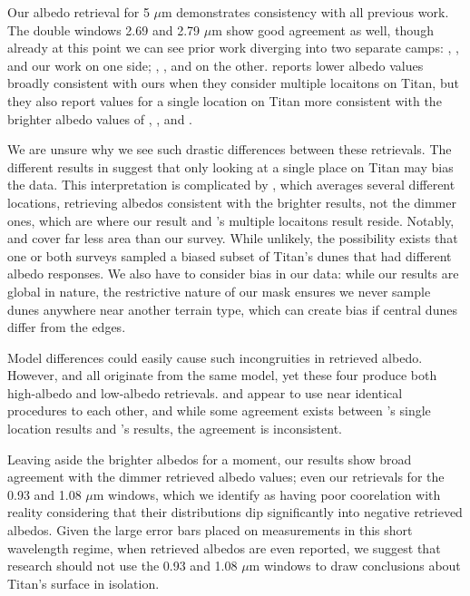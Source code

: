 \documentclass[twocolumn,linenumbers]{aastex631}
\begin{document}
\begin{table}[htbp]
\label{table:theTable}

\end{table}

Our albedo retrieval for 5 $\mu$m demonstrates consistency with all previous work. The double windows 2.69 and 2.79 $\mu$m show good agreement as well, though already at this point we can see prior work diverging into two separate camps: \cite{McCord2006}, \cite{EsSayeh2023}, and our work on one side; \cite{Bonnefoy2016}, \cite{Lopes2016}, and \cite{Brossier2018} on the other. \cite{Solomonidou2018} reports lower albedo values broadly consistent with ours when they consider multiple locaitons on Titan, but they also report values for a single location on Titan more consistent with the brighter albedo values of \cite{Bonnefoy2016}, \cite{Lopes2016}, and \cite{Brossier2018}.

We are unsure why we see such drastic differences between these retrievals. The different results in \cite{Solomonidou2018} suggest that only looking at a single place on Titan may bias the data. This interpretation is complicated by \cite{Bonnefoy2016}, which averages several different locations, retrieving albedos consistent with the brighter results, not the dimmer ones, which are where our result and \cite{Solomonidou2018}'s multiple locaitons result reside. Notably, \cite{Bonnefoy2016} and \cite{Solomonidou2018} cover far less area than our survey. While unlikely, the possibility exists that one or both surveys sampled a biased subset of Titan's dunes that had different albedo responses. We also have to consider bias in our data: while our results are global in nature, the restrictive nature of our mask ensures we never sample dunes anywhere near another terrain type, which can create bias if central dunes differ from the edges.

Model differences could easily cause such incongruities in retrieved albedo. However, \cite{Lopes2016, Solomonidou2018, Brossier2018} and \cite{EsSayeh2023} all originate from the same \cite{Hirtzig2013} model, yet these four produce both high-albedo and low-albedo retrievals. \cite{Lopes2016} and \cite{Solomonidou2018} appear to use near identical procedures to each other, and while some agreement exists between \cite{Solomonidou2018}'s single location results and \cite{Lopes2016}'s results, the agreement is inconsistent.

Leaving aside the brighter albedos for a moment, our results show broad agreement with the dimmer retrieved albedo values; even our retrievals for the 0.93 and 1.08 $\mu$m windows, which we identify as having poor coorelation with reality considering that their distributions dip significantly into negative retrieved albedos. Given the large error bars placed on measurements in this short wavelength regime, when retrieved albedos are even reported, we suggest that research should not use the 0.93 and 1.08 $\mu$m windows to draw conclusions about Titan's surface in isolation.
\end{document}
